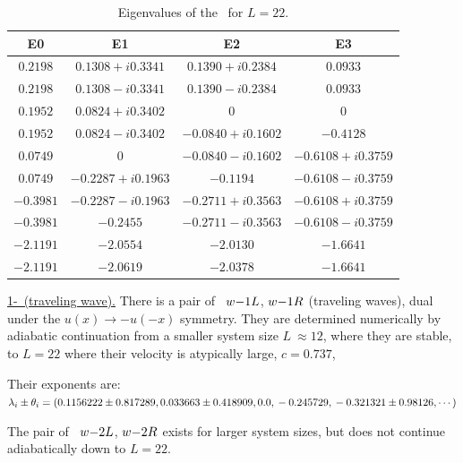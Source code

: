 \begin{table}
\caption{\label{tab:RE} Eigenvalues of the \eqva\ for $L=22$.}
{\small
\begin{tabular}{cccc} \hline
  E0       &        E1         &         E2        &     E3   \\\hline
  $0.2198$ &  $0.1308+i0.3341$ &  $0.1390+i0.2384$ &  $0.0933$\\
  $0.2198$ &  $0.1308-i0.3341$ &  $0.1390-i0.2384$ &  $0.0933$\\
  $0.1952$ &  $0.0824+i0.3402$ &  $0$              &  $0$\\
  $0.1952$ &  $0.0824-i0.3402$ & $-0.0840+i0.1602$ & $-0.4128$\\
  $0.0749$ &  $0$              & $-0.0840-i0.1602$ & $-0.6108+i0.3759$\\
  $0.0749$ & $-0.2287+i0.1963$ & $-0.1194$         & $-0.6108-i0.3759$\\
 $-0.3981$ & $-0.2287-i0.1963$ & $-0.2711+i0.3563$ & $-0.6108+i0.3759$\\
 $-0.3981$ & $-0.2455$         & $-0.2711-i0.3563$ & $-0.6108-i0.3759$\\
 $-2.1191$ & $-2.0554$         & $-2.0130$         & $-1.6641$\\
 $-2.1191$ & $-2.0619$         & $-2.0378$         & $-1.6641$\\\hline
\end{tabular}}
\end{table}


\underline{1-\reqv\  (traveling wave).}
There is a pair of \reqva\
${w-}1L$,
${w-}1R$
(traveling waves), dual under the
$u(x) \to -u(-x)$ symmetry. They are
determined numerically by
adiabatic continuation from a smaller system size
$L~\approx 12$,
where they are stable, to $L=22$
where their velocity is atypically large, $c=0.737$,

Their exponents are:
\\
$\lambda_i \pm \theta_i =
(
\\
  0.1156222 \pm 0.817289,   \\
  0.033663 \pm 0.418909,    \\
 0.0                    ,   \\
 -0.245729                    , \\
 -0.321321 \pm 0.98126,
\cdots
)$

The pair of \reqva\
${w-}2L$,
${w-}2R$
exists for larger system sizes, but does not continue
adiabatically down to $L=22$.


